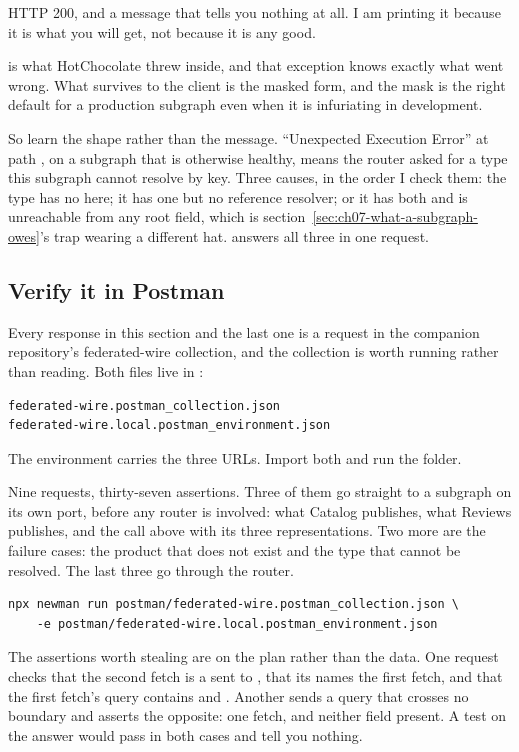 HTTP 200, and a message that tells you nothing at all. I am printing it because
it is what you will get, not because it is any good.

 is what HotChocolate threw inside, and
that exception knows exactly what went wrong. What survives to the client is the
masked form, and the mask is the right default for a production subgraph even
when it is infuriating in development.

%
So learn the shape rather than the message. \enquote{Unexpected Execution Error}
at path , on a subgraph that is otherwise healthy, means the
router asked for a type this subgraph cannot resolve by key. Three causes, in
the order I check them: the type has no  here; it has one but no
reference resolver; or it has both and is unreachable from any root field, which
is section~\ref{sec:ch07-what-a-subgraph-owes}'s trap wearing a different hat.
 answers all three in one request.

\subsection*{Verify it in Postman}

%
Every response in this section and the last one is a request in the companion
repository's federated-wire collection, and the collection is worth running
rather than reading. Both files live in :

\begin{verbatim}
federated-wire.postman_collection.json
federated-wire.local.postman_environment.json
\end{verbatim}

The environment carries the three URLs. Import both and run the folder.

Nine requests, thirty-seven assertions. Three of them go straight to a subgraph
on its own port, before any router is involved: what Catalog publishes, what
Reviews publishes, and the  call above with its three
representations. Two more are the failure cases: the product that does not exist
and the type that cannot be resolved. The last three go through the router.

\begin{verbatim}
npx newman run postman/federated-wire.postman_collection.json \
    -e postman/federated-wire.local.postman_environment.json
\end{verbatim}

%
The assertions worth stealing are on the plan rather than the data. One request
checks that the second fetch is a \code{BatchEntity} sent to \code{reviews},
that its \code{dependsOnFetchIds} names the first fetch, and that the first
fetch's query contains \code{\_\_typename} and \code{id}. Another sends a query
that crosses no boundary and asserts the opposite: one fetch, and neither field
present. A test on the answer would pass in both cases and tell you nothing.

%

